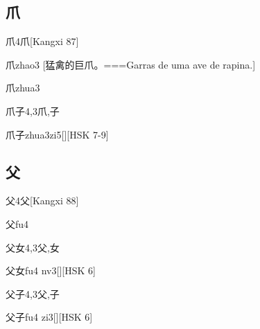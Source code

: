 \subsection*{爪}

\begin{Entry}{爪}{4}{⽖}[Kangxi 87]
  \begin{Phonetics}{爪}{zhao3}
    [猛禽的巨爪。===Garras de uma ave de rapina.]
  \end{Phonetics}
  \begin{Phonetics}{爪}{zhua3}
  \end{Phonetics}
\end{Entry}

\begin{Entry}{爪子}{4,3}{⽖,⼦}
  \begin{Phonetics}{爪子}{zhua3zi5}[][HSK 7-9]
  \end{Phonetics}
\end{Entry}

\subsection*{父}

\begin{Entry}{父}{4}{⽗}[Kangxi 88]
  \begin{Phonetics}{父}{fu4}
  \end{Phonetics}
\end{Entry}

\begin{Entry}{父女}{4,3}{⽗,⼥}
  \begin{Phonetics}{父女}{fu4 nv3}[][HSK 6]
  \end{Phonetics}
\end{Entry}

\begin{Entry}{父子}{4,3}{⽗,⼦}
  \begin{Phonetics}{父子}{fu4 zi3}[][HSK 6]
  \end{Phonetics}
\end{Entry}


